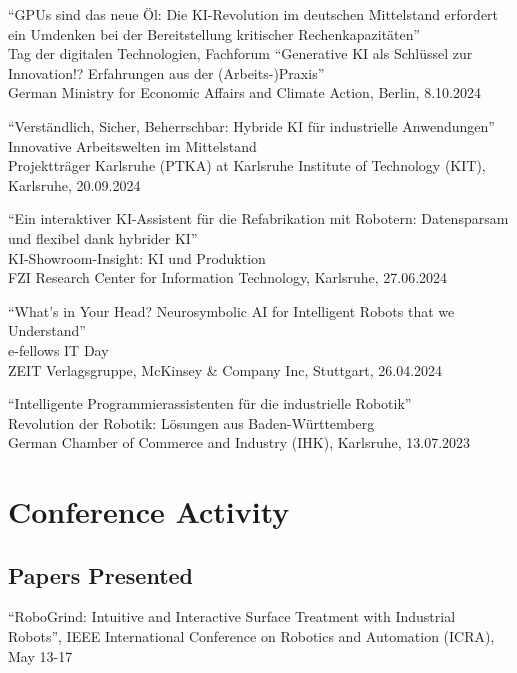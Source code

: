 \documentclass[11pt]{article} %
\begin{document}
``GPUs sind das neue Öl: Die KI-Revolution im deutschen Mittelstand erfordert ein Umdenken bei der Bereitstellung kritischer Rechenkapazitäten''\\
Tag der digitalen Technologien, Fachforum ``Generative KI als Schlüssel zur Innovation!? Erfahrungen aus der (Arbeits-)Praxis''\\
German Ministry for Economic Affairs and Climate Action, Berlin, 8.10.2024

\medskip

``Verständlich, Sicher, Beherrschbar: Hybride KI für industrielle Anwendungen''
Innovative Arbeitswelten im Mittelstand\\
Projektträger Karlsruhe (PTKA) at Karlsruhe Institute of Technology (KIT), Karlsruhe, 20.09.2024

\medskip

``Ein interaktiver KI-Assistent für die Refabrikation mit Robotern: Datensparsam und flexibel dank hybrider KI''\\
KI-Showroom-Insight: KI und Produktion\\
FZI Research Center for Information Technology, Karlsruhe, 27.06.2024

\medskip

``What's in Your Head? Neurosymbolic AI for Intelligent Robots that we Understand''\\
e-fellows IT Day\\
ZEIT Verlagsgruppe, McKinsey \& Company Inc, Stuttgart, 26.04.2024

\medskip

``Intelligente Programmierassistenten für die industrielle Robotik''\\
Revolution der Robotik: Lösungen aus Baden-Württemberg\\
German Chamber of Commerce and Industry (IHK), Karlsruhe, 13.07.2023

\section*{Conference Activity}

\subsection*{Papers Presented}

``RoboGrind: Intuitive and Interactive Surface Treatment with Industrial Robots'', IEEE International Conference on Robotics and Automation (ICRA), May 13-17
\end{document}
